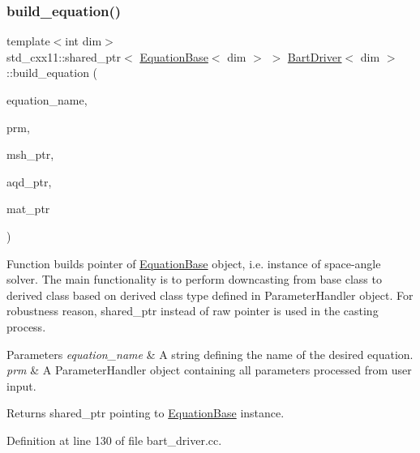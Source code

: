 \subsubsection{\texorpdfstring{build\+\_\+equation()}{build\_equation()}}
{\footnotesize\ttfamily template$<$int dim$>$ \\
std\+\_\+cxx11\+::shared\+\_\+ptr$<$ \hyperlink{class_equation_base}{Equation\+Base}$<$ dim $>$ $>$ \hyperlink{class_bart_driver}{Bart\+Driver}$<$ dim $>$\+::build\+\_\+equation (\begin{DoxyParamCaption}\item[{std\+::string}]{equation\+\_\+name,  }\item[{const Parameter\+Handler \&}]{prm,  }\item[{const std\+\_\+cxx11\+::shared\+\_\+ptr$<$ \hyperlink{class_mesh_generator}{Mesh\+Generator}$<$ dim $>$ $>$}]{msh\+\_\+ptr,  }\item[{const std\+\_\+cxx11\+::shared\+\_\+ptr$<$ \hyperlink{class_a_q_base}{A\+Q\+Base}$<$ dim $>$ $>$}]{aqd\+\_\+ptr,  }\item[{const std\+\_\+cxx11\+::shared\+\_\+ptr$<$ \hyperlink{class_material_properties}{Material\+Properties} $>$}]{mat\+\_\+ptr }\end{DoxyParamCaption})\hspace{0.3cm}{\ttfamily [private]}}

Function builds pointer of \hyperlink{class_equation_base}{Equation\+Base} object, i.\+e. instance of space-\/angle solver. The main functionality is to perform downcasting from base class to derived class based on derived class type defined in Parameter\+Handler object. For robustness reason, shared\+\_\+ptr instead of raw pointer is used in the casting process.


\begin{DoxyParams}{Parameters}
{\em equation\+\_\+name} & A string defining the name of the desired equation. \\
\hline
{\em prm} & A Parameter\+Handler object containing all parameters processed from user input. \\
\hline
\end{DoxyParams}
\begin{DoxyReturn}{Returns}
shared\+\_\+ptr pointing to \hyperlink{class_equation_base}{Equation\+Base} instance. 
\end{DoxyReturn}


Definition at line 130 of file bart\+\_\+driver.\+cc.

\mbox{\label{class_bart_driver_adc7ebcc2b3d02b7058410abef7e1b8a5}} 
